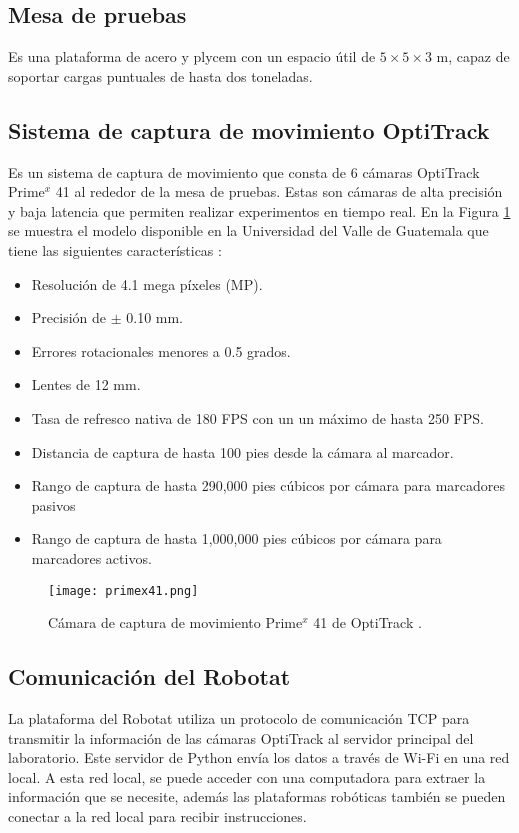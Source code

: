 \subsection{Mesa de pruebas}
Es una plataforma de acero y plycem con un espacio útil de $5 \times 5 \times 3$ m, capaz de soportar cargas puntuales de hasta dos toneladas. 

\subsection{Sistema de captura de movimiento OptiTrack}
Es un sistema de captura de movimiento que consta de 6 cámaras OptiTrack Prime$^x$ 41 al rededor de la mesa de pruebas. Estas son cámaras de alta precisión y baja latencia que permiten realizar experimentos en tiempo real. En la Figura \ref{fig:OptiTrack_primex41} se muestra el modelo disponible en la Universidad del Valle de Guatemala que tiene las siguientes características \cite{primex41}:

\begin{itemize}
	\item Resolución de 4.1 mega píxeles (MP).
	\item Precisión de $\pm$ 0.10 mm.
	\item Errores rotacionales menores a 0.5 grados.
	\item Lentes de 12 mm.
	\item Tasa de refresco nativa de 180 FPS con un un máximo de hasta 250 FPS.
	\item Distancia de captura de hasta 100 pies desde la cámara al marcador.
	\item Rango de captura de hasta 290,000 pies cúbicos por cámara para marcadores pasivos
	\item Rango de captura de hasta 1,000,000 pies cúbicos por cámara para marcadores activos.
\end{itemize}

\begin{figure}[H]
	\centering
	\texttt{[image: primex41.png]}
	\caption{Cámara de captura de movimiento Prime$^x$ 41 de OptiTrack \cite{primex41}.}
	\label{fig:OptiTrack_primex41}
\end{figure}

\subsection{Comunicación del Robotat}
La plataforma del Robotat utiliza un protocolo de comunicación TCP para transmitir la información de las cámaras OptiTrack al servidor principal del laboratorio. Este servidor de Python envía los datos a través de Wi-Fi en una red local. A esta red local, se puede acceder con una computadora para extraer la información que se necesite, además las plataformas robóticas también se pueden conectar a la red local para recibir instrucciones.

